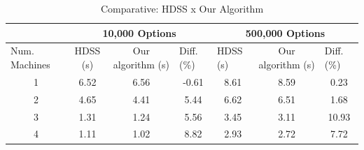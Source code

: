 \documentclass[journal]{IEEEtran}
\begin{document}
\begin{table}[htb]
\centering
\caption{Comparative: HDSS x Our Algorithm}
\begin{scriptsize}
\begin{tabular}{c|c|c|c|c|c|c|}
\cline{2-7}
\multicolumn{1}{l|}{}                 & \multicolumn{3}{c|}{10,000 Options}                              & \multicolumn{3}{c|}{500,000 Options}                                                  \\ \hline
\multicolumn{1}{|l|}{Num. Machines} & HDSS (s) & Our algorithm (s) & \multicolumn{1}{l|}{Diff. (\%)} & \multicolumn{1}{l|}{HDSS (s)} & Our algorithm (s) & \multicolumn{1}{l|}{Diff. (\%)} \\ \hline
\multicolumn{1}{|c|}{1 }       & 6.52     & 6.56              &    -0.61                       
			 & 8.61                          & 8.59              &   0.23                         \\ \hline
\multicolumn{1}{|c|}{2 }      & 4.65     & 4.41              &    5.44                         
				& 6.62                          & 6.51              & 1.68                            \\ \hline
\multicolumn{1}{|c|}{3 }      & 1.31     & 1.24              & 5.56                            
			& 3.45                          & 3.11              &         10.93                    \\ \hline
\multicolumn{1}{|c|}{4 }      & 1.11     & 1.02              & 8.82                       
			    & 2.93                          & 2.72              &         7.72                  \\ \hline
\end{tabular}
\end{scriptsize}
\label{table: black}
\end{table}
\end{document}
